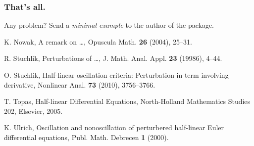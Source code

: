 \documentclass[envcountsect,t,10pt]{beamer}
\begin{document}
 

\begin{frame}
  \frametitle{That's all. }
  Any problem? Send a \textit{minimal example} to the author of the
  package.
\end{frame}

\begin{thebibliography}{10}
 {K. Nowak}, A remark on \dots , Opuscula Math. {\bf 26}
  (2004), 25--31.

 {R. Stuchlik}, Perturbations of \dots ,
  J. Math. Anal. Appl. {\bf 23} (19986), 4--44.

 {O. Stuchlik}, Half-linear oscillation criteria:
  Perturbation in term involving derivative, Nonlinear Anal. {\bf 73}
  (2010), 3756--3766.

 {T. Topas}, Half-linear Differential Equations,
  North-Holland Mathematics Studies 202, Elsevier, 2005.

 {K. Ulrich}, Oscillation and nonoscillation of
  perturbered half-linear Euler differential equations,
  Publ. Math. Debrecen {\bf 1} (2000).


\end{thebibliography}
\end{document}
